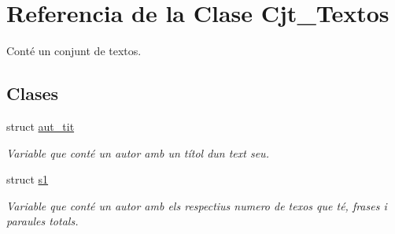 \hypertarget{class_cjt___textos}{}\section{Referencia de la Clase Cjt\+\_\+\+Textos}
\label{class_cjt___textos}


Conté un conjunt de textos.  


\subsection*{Clases}
\begin{DoxyCompactItemize}
\item 
struct \hyperlink{struct_cjt___textos_1_1aut__tit}{aut\+\_\+tit}
\begin{DoxyCompactList}\small\item\em Variable que conté un autor amb un títol d\textquotesingle{}un text seu. \end{DoxyCompactList}\item 
struct \hyperlink{struct_cjt___textos_1_1s1}{s1}
\begin{DoxyCompactList}\small\item\em Variable que conté un autor amb els respectius numero de texos que té, frases i paraules totals. \end{DoxyCompactList}\end{DoxyCompactItemize}
